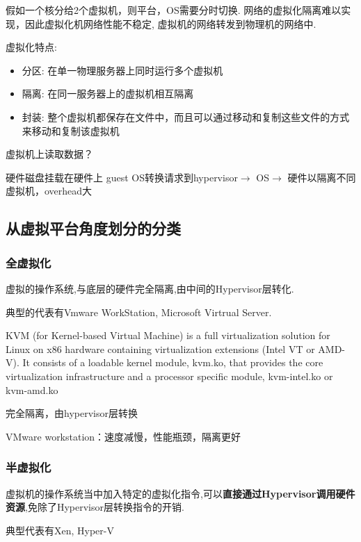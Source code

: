 假如一个核分给2个虚拟机，则平台，OS需要分时切换.️ 网络的虚拟化隔离难以实现，因此虚拟化机网络性能不稳定, 虚拟机的网络转发到物理机的网络中.

虚拟化特点:

\begin{itemize}
    \item 分区: 在单一物理服务器上同时运行多个虚拟机
    \item 隔离: 在同一服务器上的虚拟机相互隔离
    \item 封装: 整个虚拟机都保存在文件中，而且可以通过移动和复制这些文件的方式来移动和复制该虚拟机
\end{itemize}

虚拟机上读取数据？ 

硬件磁盘挂载在硬件上 guest OS转换请求到hypervisor$\rightarrow$ OS$\rightarrow$ 硬件以隔离不同虚拟机，overhead大

\subsection{从虚拟平台角度划分的分类}

\subsubsection{全虚拟化}

\begin{definition}[全虚拟化]
    虚拟的操作系统,与底层的硬件完全隔离,由中间的Hypervisor层转化. 
    
    典型的代表有Vmware WorkStation, Microsoft Virtrual Server. 
\end{definition}

\begin{definition}[KVM]
    KVM (for Kernel-based Virtual Machine) is a full virtualization solution for Linux on x86 hardware containing virtualization extensions (Intel VT or AMD-V). It consists of a loadable kernel module, kvm.ko, that provides the core virtualization infrastructure and a processor specific module, kvm-intel.ko or kvm-amd.ko
\end{definition}

完全隔离，由hypervisor层转换 

VMware workstation：速度减慢，性能瓶颈，隔离更好

\subsubsection{半虚拟化}

\begin{definition}[半虚拟化]
    虚拟机的操作系统当中加入特定的虚拟化指令,可以\textbf{直接通过Hypervisor调用硬件资源},免除了Hypervisor层转换指令的开销. 
    
    典型代表有Xen, Hyper-V
\end{definition}

